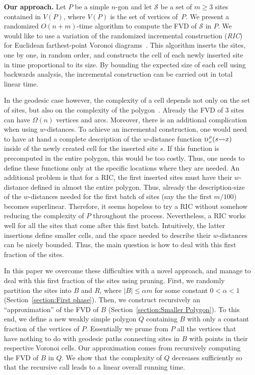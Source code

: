 \documentclass[a4paper,UKenglish]{socg-lipics-v2018}
\newcommand{\s}{\mathcal S}
\newcommand{\dd}[3][P]{\ensuremath{\textsc{d}_{\scriptscriptstyle w}^{\scriptscriptstyle #1}(#2 {\leadsto} #3)}}
\begin{document}
\textbf{Our approach.}
Let  $P$ be a simple $n$-gon and let $\s$ be a set of $m\geq 3$ sites contained in $V(P)$, where $V(P)$ is the set of vertices of~$P$.
We present a randomized $O(n+m)$-time algorithm to compute the FVD of $\s$ in $P$.
We would like to use a variation of the randomized incremental construction (\emph{RIC}) for Euclidean farthest-point Voronoi diagrams~\cite{de2000computational}.
This algorithm inserts the sites, one by one, in random order, and constructs the cell of each newly inserted site in time proportional to its size. 
By bounding the expected size of each cell using backwards analysis, the incremental construction can be carried out in total linear time. 

In the geodesic case however, the complexity of a cell depends not only on the set of sites, but also on the complexity of the polygon~\cite{aronov1989geodesic}. 
Already the FVD of 3 sites can have $\Omega(n)$ vertices and arcs.
Moreover, there is an additional complication when using $w$-distances.
To achieve an incremental construction, one would need to have at hand a complete description of the $w$-distance function $\dd{s}{x}$ inside of the newly created cell for the inserted site $s$.
If this function is precomputed in the entire polygon, this would be too costly. 
Thus, one needs to define these functions only at the specific locations where they are needed. 
An additional problem is that for a RIC, the first inserted sites must have their $w$-distance defined in almost the entire polygon.
Thus, already the description-size of the $w$-distances needed for the first batch of sites (say the the first $m/100$) becomes superlinear. 
Therefore, it seems hopeless to try a RIC without somehow reducing the complexity of $P$ throughout the process. 
Nevertheless, a RIC works well for all the sites that come after this first batch. 
Intuitively,  the latter insertions define smaller cells, and the space needed to describe their $w$-distances can be nicely bounded.
Thus, the main question is how to deal with this first fraction of the sites.

In this paper we overcome these difficulties with a novel approach, and manage to deal with this first fraction of the sites using pruning.
First, we randomly partition the sites into $B$ and $R$, where $|B| \leq \alpha m$ for some constant $0 < \alpha < 1$ (Section~\ref{section:First phase}).
Then, we construct recursively an ``approximation'' of the FVD of $B$ (Section~\ref{section:Smaller Polygon}). 
To this end, we define a new weakly simple polygon $Q$ containing $B$ with only a constant fraction of the vertices of $P$. 
Essentially we prune from $P$ all the vertices that have nothing to do with geodesic paths connecting sites in $B$ with points in their respective Voronoi cells. 
Our approximation comes from recursively computing the FVD of $B$ in $Q$. 
We show that the complexity of $Q$ decreases sufficiently so that the recursive call leads to a linear overall running time.
\end{document}
